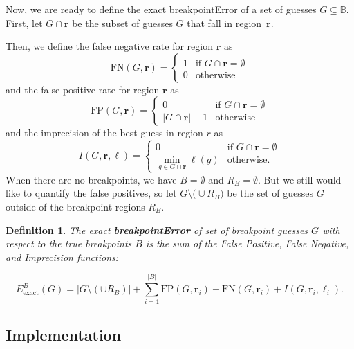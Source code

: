 \documentclass{jsfds} %
\newtheorem{definition}{Definition}
\renewcommand{\r}{ \mathbf{ r} }
\begin{document}
Now, we are ready to define the exact breakpointError of a set of
guesses $G\subseteq\mathbb B$.
First, let $G \cap\r$ be the subset of guesses $G$ that fall in
region~$\r$. 

Then, we define the false negative rate for region $\r$ as 
\begin{equation}
  \label{eq:FN_i}
  \text{FN}(G,\r) = 
  \begin{cases}
    1 & \text{if } G\cap\r = \emptyset\\
    0 & \text{otherwise}
  \end{cases}
\end{equation}
and the false positive rate for region $\r$ as
\begin{equation}
  \label{eq:FP_i}
  \text{FP}(G,\r) =
  \begin{cases}
    0 & \text{if }G\cap\r = \emptyset\\
    |G\cap\r|-1 &\text{otherwise}
  \end{cases}
\end{equation}
and the imprecision of the best guess in region $r$ as
\begin{equation}
  \label{eq:imprecision}
  I(G,\r,\ell) =
  \begin{cases}
    0 & \text{if } G\cap\r = \emptyset\\
    \min_{g\in G\cap\r} \ell(g) & \text{otherwise}.
  \end{cases}
\end{equation}
When there are no breakpoints, we have $B=\emptyset$ and
$R_B=\emptyset$. But we still would like to quantify the false
positives, so let $G\setminus\big( \cup R_B\big) $ be the set of
guesses $G$ outside of the breakpoint regions $R_B$. 

\begin{definition}
  \label{def:exact_breakpoint_cost}
  The exact \textbf{breakpointError} of set of breakpoint guesses $G$ with
  respect to the true breakpoints $B$ is the sum of the False
  Positive, False Negative, and Imprecision functions:

\begin{equation*}
  {E }_{\text{exact}}^B(G) =
  \big|G\setminus(\cup R_B)\big|
 + \sum_{i=1}^{|B|}\text{FP}(G,\r_i)+\text{FN}(G,\r_i)+I(G,\r_i,\ell_i).
\end{equation*}
\end{definition}

\subsection{Implementation}
\end{document}

